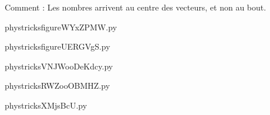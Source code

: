     Comment : Les nombres arrivent au centre des vecteurs, et non au bout.

    \clearpage
    


    \newcommand{\CaptionFigfigureWYxZPMW}{<+Type your caption here+>}
    \begin{center}
        
    \end{center}
    phystricksfigureWYxZPMW.py

    

    \clearpage
    


    \newcommand{\CaptionFigfigureUERGVgS}{<+Type your caption here+>}
    \begin{center}
        
    \end{center}
    phystricksfigureUERGVgS.py

    

    \clearpage
    


    \newcommand{\CaptionFigVNJWooDeKdcy}{<+Type your caption here+>}
    \begin{center}
        
    \end{center}
    phystricksVNJWooDeKdcy.py

    

    \clearpage
    


    \newcommand{\CaptionFigRWZooOBMHZ}{<+Type your caption here+>}
    \begin{center}
        
    \end{center}
    phystricksRWZooOBMHZ.py

    

    \clearpage
    


    \newcommand{\CaptionFigXMjsBcU}{<+Type your caption here+>}
    \begin{center}
        
    \end{center}
    phystricksXMjsBcU.py

    

    \clearpage
    

